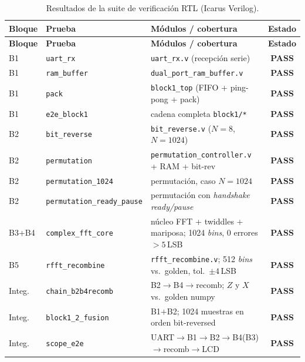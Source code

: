 \documentclass[11pt,a4paper]{article}
\begin{document}
\renewcommand{\arraystretch}{1.25}
\begin{longtable}{@{}p{2.0cm} p{4.0cm} p{6.6cm} c@{}}
\caption{Resultados de la suite de verificación RTL (Icarus Verilog).}\label{tab:results}\\
\toprule
\textbf{Bloque} & \textbf{Prueba} & \textbf{Módulos / cobertura} & \textbf{Estado}\\
\midrule
\endfirsthead
\toprule
\textbf{Bloque} & \textbf{Prueba} & \textbf{Módulos / cobertura} & \textbf{Estado}\\
\midrule
\endhead
\bottomrule
\endfoot
B1 & \texttt{uart\_rx} & \texttt{uart\_rx.v} (recepción serie) & \textbf{PASS} \\
B1 & \texttt{ram\_buffer} & \texttt{dual\_port\_ram\_buffer.v} & \textbf{PASS} \\
B1 & \texttt{pack} & \texttt{block1\_top} (FIFO + ping-pong + pack) & \textbf{PASS} \\
B1 & \texttt{e2e\_block1} & cadena completa \texttt{block1/*} & \textbf{PASS} \\
B2 & \texttt{bit\_reverse} & \texttt{bit\_reverse.v} ($N=8$, $N=1024$) & \textbf{PASS} \\
B2 & \texttt{permutation} & \texttt{permutation\_controller.v} + RAM + bit-rev & \textbf{PASS} \\
B2 & \texttt{permutation\_1024} & permutación, caso $N=1024$ & \textbf{PASS} \\
B2 & \texttt{permutation\_ready\_pause} & permutación con \emph{handshake ready/pause} & \textbf{PASS} \\
B3+B4 & \texttt{complex\_fft\_core} & núcleo FFT + twiddles + mariposa; 1024 \emph{bins}, 0 errores $>5$\,LSB & \textbf{PASS} \\
B5 & \texttt{rfft\_recombine} & \texttt{rfft\_recombine.v}; 512 \emph{bins} vs.\ golden, tol.\ $\pm4$\,LSB & \textbf{PASS} \\
Integ. & \texttt{chain\_b2b4recomb} & B2$\to$B4$\to$recomb; $Z$ y $X$ vs.\ golden numpy & \textbf{PASS} \\
Integ. & \texttt{block1\_2\_fusion} & B1$+$B2; 1024 muestras en orden bit-reversed & \textbf{PASS} \\
Integ. & \texttt{scope\_e2e} & UART$\to$B1$\to$B2$\to$B4(B3)$\to$recomb$\to$LCD & \textbf{PASS} \\
\end{longtable}
\end{document}
